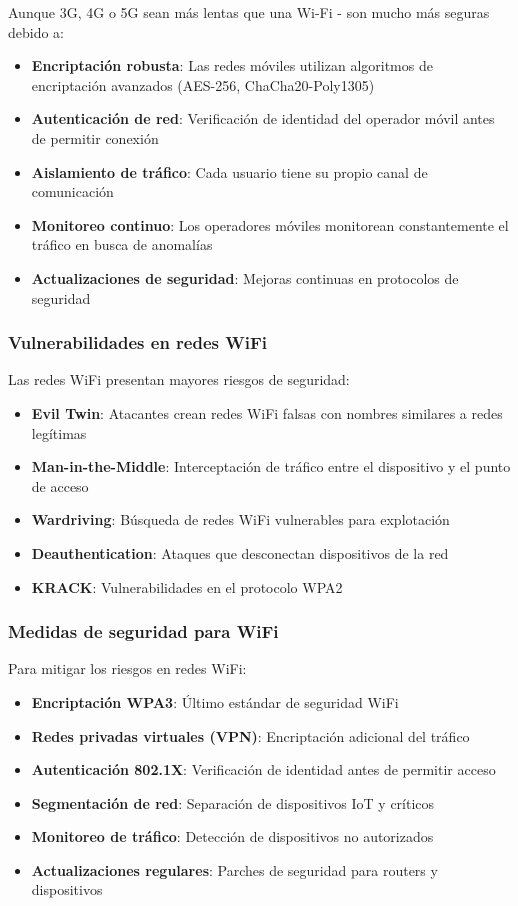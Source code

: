 Aunque 3G, 4G o 5G sean más lentas que una Wi-Fi - son mucho más seguras debido a:

\begin{itemize}
    \item \textbf{Encriptación robusta}: Las redes móviles utilizan algoritmos de encriptación avanzados (AES-256, ChaCha20-Poly1305)
    \item \textbf{Autenticación de red}: Verificación de identidad del operador móvil antes de permitir conexión
    \item \textbf{Aislamiento de tráfico}: Cada usuario tiene su propio canal de comunicación
    \item \textbf{Monitoreo continuo}: Los operadores móviles monitorean constantemente el tráfico en busca de anomalías
    \item \textbf{Actualizaciones de seguridad}: Mejoras continuas en protocolos de seguridad
\end{itemize}

\subsubsection{Vulnerabilidades en redes WiFi}

Las redes WiFi presentan mayores riesgos de seguridad:

\begin{itemize}
    \item \textbf{Evil Twin}: Atacantes crean redes WiFi falsas con nombres similares a redes legítimas
    \item \textbf{Man-in-the-Middle}: Interceptación de tráfico entre el dispositivo y el punto de acceso
    \item \textbf{Wardriving}: Búsqueda de redes WiFi vulnerables para explotación
    \item \textbf{Deauthentication}: Ataques que desconectan dispositivos de la red
    \item \textbf{KRACK}: Vulnerabilidades en el protocolo WPA2
\end{itemize}

\subsubsection{Medidas de seguridad para WiFi}

Para mitigar los riesgos en redes WiFi:

\begin{itemize}
    \item \textbf{Encriptación WPA3}: Último estándar de seguridad WiFi
    \item \textbf{Redes privadas virtuales (VPN)}: Encriptación adicional del tráfico
    \item \textbf{Autenticación 802.1X}: Verificación de identidad antes de permitir acceso
    \item \textbf{Segmentación de red}: Separación de dispositivos IoT y críticos
    \item \textbf{Monitoreo de tráfico}: Detección de dispositivos no autorizados
    \item \textbf{Actualizaciones regulares}: Parches de seguridad para routers y dispositivos
\end{itemize} 


